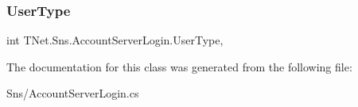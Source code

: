\subsubsection{\texorpdfstring{User\+Type}{UserType}}
{\footnotesize\ttfamily int T\+Net.\+Sns.\+Account\+Server\+Login.\+User\+Type\hspace{0.3cm}{\ttfamily [get]}, {}}







The documentation for this class was generated from the following file\+:\begin{DoxyCompactItemize}
\item 
Sns/Account\+Server\+Login.\+cs\end{DoxyCompactItemize}
